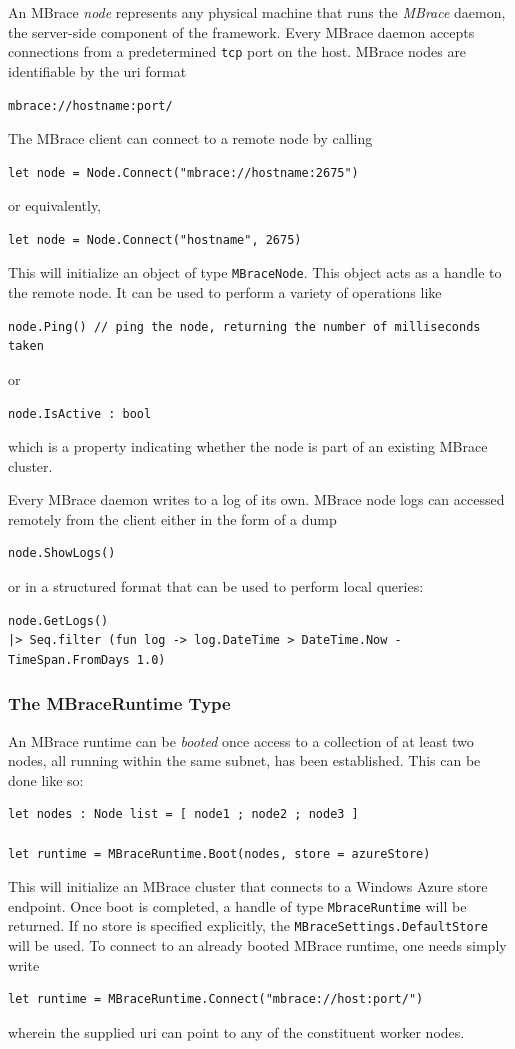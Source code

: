 \documentclass[9pt,a4paper]{article}
\newcommand{\mbrace}{MBrace}
\newcommand{\Mbrace}{MBrace}
\newcommand{\centertt}[1]{\begin{center}\texttt{#1}\end{center}}
\begin{document}
An \mbrace{} \emph{node} represents any physical machine that runs the \emph{\mbrace{}} daemon, 
the server-side component of the framework. Every \mbrace{} daemon accepts connections from a predetermined 
\texttt{tcp} port on the host. \Mbrace{} nodes are identifiable by the uri format
\centertt{mbrace://hostname:port/}
The \mbrace{} client can connect to a remote node by calling
\begin{lstlisting}
let node = Node.Connect("mbrace://hostname:2675")
\end{lstlisting}
or equivalently,
\begin{lstlisting}
let node = Node.Connect("hostname", 2675)
\end{lstlisting}
This will initialize an object of type \texttt{MBraceNode}. This object acts as a handle
to the remote node. It can be used to perform a variety of operations like
\begin{lstlisting}
node.Ping() // ping the node, returning the number of milliseconds taken
\end{lstlisting}
or
\begin{lstlisting}
node.IsActive : bool
\end{lstlisting}
which is a property indicating whether the node is part of an existing \mbrace{} cluster.

Every \mbrace{} daemon writes to a log of its own. \Mbrace{} node logs can accessed remotely
from the client either in the form of a dump
\begin{lstlisting}
node.ShowLogs()
\end{lstlisting}
or in a structured format that can be used to perform local queries:
\begin{lstlisting}
node.GetLogs() 
|> Seq.filter (fun log -> log.DateTime > DateTime.Now - TimeSpan.FromDays 1.0)
\end{lstlisting}

\subsubsection*{The MBraceRuntime Type}

An \mbrace{} runtime can be \emph{booted} once access to a collection of at least two nodes,
all running within the same subnet, has been established. This can be done like so:
\begin{lstlisting}
let nodes : Node list = [ node1 ; node2 ; node3 ]

let runtime = MBraceRuntime.Boot(nodes, store = azureStore)
\end{lstlisting}
This will initialize an \mbrace{} cluster that connects to a Windows Azure store endpoint.
Once boot is completed, a handle of type \texttt{MbraceRuntime} will be returned.
If no store is specified explicitly, the \texttt{MBraceSettings.DefaultStore} will be used.
%
To connect to an already booted \mbrace{} runtime, one needs simply write
\begin{lstlisting}
let runtime = MBraceRuntime.Connect("mbrace://host:port/")
\end{lstlisting}
wherein the supplied uri can point to any of the constituent worker nodes.
\end{document}
